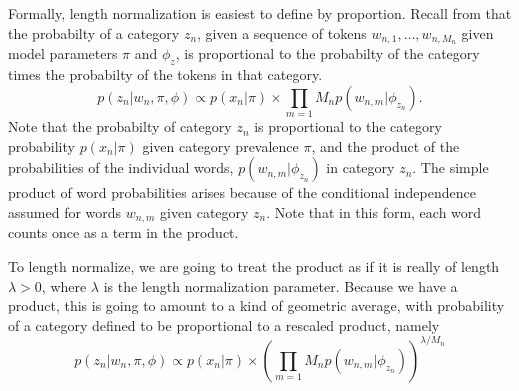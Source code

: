 Formally, length normalization is easiest to define by proportion.
Recall from  that the probabilty of a category
$z_n$, given a sequence of tokens $w_{n,1},\ldots,w_{n,M_n}$ given
model parameters $\pi$ and $\phi_z$, is proportional to the probabilty
of the category times the probabilty of the tokens in that category.
%
\begin{equation}
p(z_n|w_n,\pi,\phi) \propto p(x_n|\pi) \times \prod_{m=1}{M_n} p(w_{n,m}|\phi_{z_n}).
\end{equation}
%
Note that the probabilty of category $z_n$ is proportional to the
category probability $p(x_n|\pi)$ given category prevalence $\pi$, and
the product of the probabilities of the individual words,
$p(w_{n,m}|\phi_{z_n})$ in category $z_n$.  The simple product of word
probabilities arises because of the conditional independence assumed
for words $w_{n,m}$ given category $z_n$.  Note that in this form,
each word counts once as a term in the product.  

To length normalize, we are going to treat the product as if it is
really of length $\lambda > 0$, where $\lambda$ is the length
normalization parameter.  Because we have a product, this is going to
amount to a kind of geometric average, with probability of a category
defined to be proportional to a rescaled product, namely
%
\begin{equation}
p(z_n|w_n,\pi,\phi) \propto p(x_n|\pi) \times \left( \prod_{m=1}{M_n} p(w_{n,m}|\phi_{z_n}) \right)^{\textstyle \lambda / M_n}
\end{equation}











